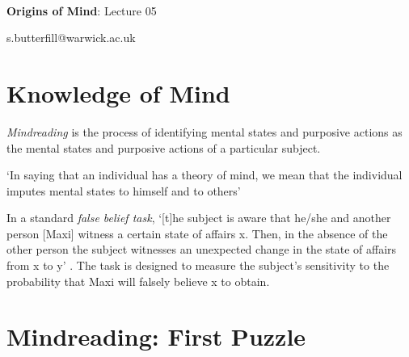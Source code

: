 \documentclass[12pt]{extarticle}
\date{}
\makeatletter
\def \ititle {Origins of Mind}
\def \isubtitle {Lecture 02}
\def \iemail{s.butterfill@warwick.ac.uk}
\makeatother
\begin{document}
\begin{multicols}{3}

\setlength\footnotesep{1em}









\def \ititle {Origins of Mind}
 
\def \isubtitle {Lecture 05}
 
 
 
\
 
 
 
\begin{center}
 
{\Large
 
\textbf{\ititle}: \isubtitle
 
}
 
 
 
\iemail %
 
\end{center}
 
 
 
\section{Knowledge of Mind}
 
\textit{Mindreading} is the process of identifying mental states and purposive actions as the mental states and purposive actions of a particular subject.
 
‘In saying that an individual has a theory of mind, we mean that the individual imputes mental states to himself and to others’
\citep[p.\ 515]{premack_does_1978}
 
In a standard \textit{false belief task}, `[t]he subject is aware that he/she and another person [Maxi] witness a certain state of affairs x. Then, in the absence of the other person the subject witnesses an unexpected change in the state of affairs from x to y' \citep[p.\ 106]{Wimmer:1983dz}. The task is designed to measure the subject's sensitivity to the probability that Maxi will falsely believe x to obtain.
 
 
 
\section{Mindreading: First Puzzle}
 

\end{multicols}
\end{document}
